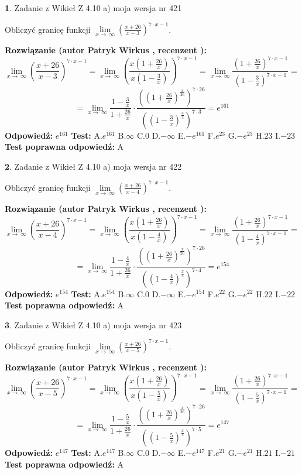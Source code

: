 \documentclass[12pt, a4paper]{article}
\theoremstyle{definition} %
\newtheorem{zad}{}
\newcommand{\zadStart}[1]{\begin{zad}#1\newline}
\newcommand{\zadStop}{\end{zad}}
\newcommand{\rozwStart}[2]{\noindent \textbf{Rozwiązanie (autor #1 , recenzent #2): }\newline}
\newcommand{\rozwStop}{\newline}
\newcommand{\odpStart}{\noindent \textbf{Odpowiedź:}\newline}
\newcommand{\odpStop}{\newline}
\newcommand{\testStart}{\noindent \textbf{Test:}\newline}
\newcommand{\testStop}{\newline}
\newcommand{\kluczStart}{\noindent \textbf{Test poprawna odpowiedź:}\newline}
\newcommand{\kluczStop}{\newline}
\begin{document}
\zadStart{Zadanie z Wikieł Z 4.10 a) moja wersja nr 421}

Obliczyć granicę funkcji  $\lim\limits_{x\to\ \infty}(\frac{x+26}{x-3})^{7\cdot x-1}$.
\zadStop
\rozwStart{Patryk Wirkus}{}
$$\lim\limits_{x\to\ \infty}(\frac{x+26}{x-3})^{7\cdot x-1} = \lim\limits_{x\to\ \infty}(\frac{x(1+\frac{26}{x})}{x(1-\frac{3}{x})})^{7\cdot x-1}=\lim\limits_{x\to\ \infty}\frac{(1+\frac{26}{x})^{7\cdot x-1}}{(1-\frac{3}{x})^{7\cdot x-1}}=$$
$$=\lim\limits_{x\to\ \infty}\frac{1-\frac{3}{x}}{1+\frac{26}{x}}\cdot\frac{((1+\frac{26}{x})^{\frac{x}{26}})^{7\cdot26}}{((1-\frac{3}{x})^{\frac{x}{3}})^{7\cdot3}}=e^{161}$$
\rozwStop
\odpStart
$e^{161}$
\odpStop
\testStart
A.$e^{161}$ B.$\infty$ C.$0$ D.$-\infty$ E.$-e^{161}$
F.$e^{23}$ G.$-e^{23}$
H.$23$
I.$-23$
\testStop
\kluczStart
A
\kluczStop



\zadStart{Zadanie z Wikieł Z 4.10 a) moja wersja nr 422}

Obliczyć granicę funkcji  $\lim\limits_{x\to\ \infty}(\frac{x+26}{x-4})^{7\cdot x-1}$.
\zadStop
\rozwStart{Patryk Wirkus}{}
$$\lim\limits_{x\to\ \infty}(\frac{x+26}{x-4})^{7\cdot x-1} = \lim\limits_{x\to\ \infty}(\frac{x(1+\frac{26}{x})}{x(1-\frac{4}{x})})^{7\cdot x-1}=\lim\limits_{x\to\ \infty}\frac{(1+\frac{26}{x})^{7\cdot x-1}}{(1-\frac{4}{x})^{7\cdot x-1}}=$$
$$=\lim\limits_{x\to\ \infty}\frac{1-\frac{4}{x}}{1+\frac{26}{x}}\cdot\frac{((1+\frac{26}{x})^{\frac{x}{26}})^{7\cdot26}}{((1-\frac{4}{x})^{\frac{x}{4}})^{7\cdot4}}=e^{154}$$
\rozwStop
\odpStart
$e^{154}$
\odpStop
\testStart
A.$e^{154}$ B.$\infty$ C.$0$ D.$-\infty$ E.$-e^{154}$
F.$e^{22}$ G.$-e^{22}$
H.$22$
I.$-22$
\testStop
\kluczStart
A
\kluczStop



\zadStart{Zadanie z Wikieł Z 4.10 a) moja wersja nr 423}

Obliczyć granicę funkcji  $\lim\limits_{x\to\ \infty}(\frac{x+26}{x-5})^{7\cdot x-1}$.
\zadStop
\rozwStart{Patryk Wirkus}{}
$$\lim\limits_{x\to\ \infty}(\frac{x+26}{x-5})^{7\cdot x-1} = \lim\limits_{x\to\ \infty}(\frac{x(1+\frac{26}{x})}{x(1-\frac{5}{x})})^{7\cdot x-1}=\lim\limits_{x\to\ \infty}\frac{(1+\frac{26}{x})^{7\cdot x-1}}{(1-\frac{5}{x})^{7\cdot x-1}}=$$
$$=\lim\limits_{x\to\ \infty}\frac{1-\frac{5}{x}}{1+\frac{26}{x}}\cdot\frac{((1+\frac{26}{x})^{\frac{x}{26}})^{7\cdot26}}{((1-\frac{5}{x})^{\frac{x}{5}})^{7\cdot5}}=e^{147}$$
\rozwStop
\odpStart
$e^{147}$
\odpStop
\testStart
A.$e^{147}$ B.$\infty$ C.$0$ D.$-\infty$ E.$-e^{147}$
F.$e^{21}$ G.$-e^{21}$
H.$21$
I.$-21$
\testStop
\kluczStart
A
\kluczStop
\end{document}

